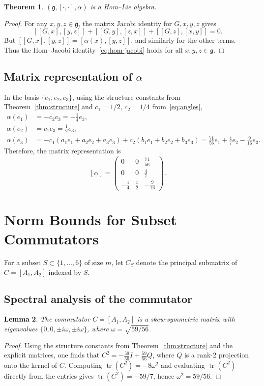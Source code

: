 \documentclass[a4paper]{amsart}
\theoremstyle{plain}
\newtheorem{theorem}{Theorem}[section]
\newtheorem{lemma}[theorem]{Lemma}
\theoremstyle{definition}
\theoremstyle{remark}
\newcommand{\g}{\mathfrak{g}}
\newcommand{\tr}{\operatorname{tr}}
\begin{document}
	\begin{theorem} $(\g, [\cdot,\cdot], \alpha)$ is a Hom--Lie algebra.
	\end{theorem}
	\begin{proof} For any $x,y,z\in\g$, the matrix Jacobi identity for $G,x,y,z$ gives
		\[
		[[G,x], [y,z]] + [[G,y], [z,x]] + [[G,z], [x,y]] = 0.
		\]
		But $[[G,x], [y,z]] = [\alpha(x), [y,z]]$, and similarly for the other terms. Thus the Hom--Jacobi identity~\eqref{eq:hom-jacobi} holds for all $x,y,z\in\g$.
	\end{proof}
	
	\subsection{Matrix representation of $\alpha$}
	\label{subsec:alpha-matrix}
	
	In the basis $\{e_1,e_2,e_3\}$, using the structure constants from Theorem~\ref{thm:structure} and $c_1=1/2$, $c_2=1/4$ from~\eqref{eq:angles},
	\begin{align*}
		\alpha(e_1) &= -c_2 e_3 = -\frac{1}{4}e_3,\\
		\alpha(e_2) &= c_1 e_3 = \frac{1}{2}e_3,\\
		\alpha(e_3) &= -c_1(a_1 e_1 + a_2 e_2 + a_3 e_3) + c_2(b_1 e_1 + b_2 e_2 + b_3 e_3) = \frac{71}{56}e_1 + \frac{4}{7}e_2 - \frac{9}{16}e_3.
	\end{align*}
	Therefore, the matrix representation is
	\[
	[\alpha]= \begin{pmatrix}
		0 & 0 & \frac{71}{56} \\
		0 & 0 & \frac{4}{7} \\
		-\frac{1}{4} & \frac{1}{2} & -\frac{9}{16}
	\end{pmatrix}.
	\]
	
	\section{Norm Bounds for Subset Commutators}
	\label{sec:norm-bounds}
	
	For a subset $S \subset \{1,\dots,6\}$ of size $m$, let $C_S$ denote the principal submatrix of $C = [A_1, A_2]$ indexed by $S$.
	
	\subsection{Spectral analysis of the commutator}
	\label{subsec:eigenvalues}
	
	\begin{lemma} The commutator $C = [A_1, A_2]$ is a skew-symmetric matrix with eigenvalues $\{0, 0, \pm i\omega, \pm i\omega\}$, where $\omega = \sqrt{59/56}$.
	\end{lemma}
	\begin{proof} Using the structure constants from Theorem~\ref{thm:structure} and the explicit matrices, one finds that $C^2 = -\frac{59}{56} I + \frac{59}{56} Q$, where $Q$ is a rank-2 projection onto the kernel of $C$. Computing $\tr(C^2) = -8\omega^2$ and evaluating $\tr(C^2)$ directly from the entries gives $\tr(C^2) = -59/7$, hence $\omega^2 = 59/56$.
	\end{proof}
	
\end{document}
